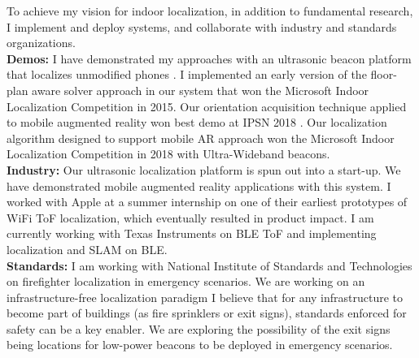 \documentclass[10pt]{article}
\begin{document}
To achieve my vision for indoor localization, in addition to fundamental research, I implement and deploy systems, and collaborate with industry and standards organizations. \\%
\textbf{Demos:} I have demonstrated my approaches with an ultrasonic beacon platform that localizes unmodified phones \cite{lazik2015alps, lazik2015alpsdemo, rtas-alps-platform}. 
I implemented an early version of the floor-plan aware solver approach \cite{rajagopal2018enhancing} in our system that won the Microsoft Indoor Localization Competition in 2015. Our orientation acquisition technique applied to mobile augmented reality won best demo at IPSN 2018 \cite{rajagopal2018welcome}. Our localization algorithm designed to support mobile AR approach \cite{mobileAR} won the Microsoft Indoor Localization Competition in 2018 with Ultra-Wideband beacons.\\
\textbf{Industry:} Our ultrasonic localization platform is spun out into a start-up. We have demonstrated mobile augmented reality applications with this system. I worked with Apple at a summer internship on one of their earliest prototypes of WiFi ToF localization, which eventually resulted in product impact. I am currently working with Texas Instruments on BLE ToF and implementing localization and SLAM on BLE. 
\cite{beaconplacementtheory}\\
\textbf{Standards:} I am working with National Institute of Standards and Technologies on firefighter localization in emergency scenarios. We are working on an infrastructure-free localization paradigm I believe that for any infrastructure to become part of buildings (as fire sprinklers or exit signs), standards enforced for safety can be a key enabler. We are exploring the possibility of the exit signs being locations for low-power beacons to be deployed in emergency scenarios.\\



\end{document}
